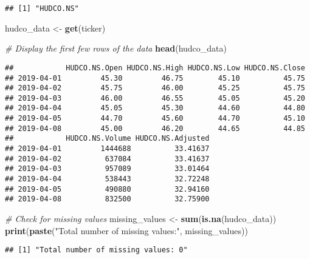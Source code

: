 \documentclass[
]{article}
\newenvironment{Shaded}{\begin{snugshade}}{\end{snugshade}}
\newcommand{\AttributeTok}[1]{\textcolor[rgb]{0.13,0.29,0.53}{#1}}
\newcommand{\CommentTok}[1]{\textcolor[rgb]{0.56,0.35,0.01}{\textit{#1}}}
\newcommand{\DecValTok}[1]{\textcolor[rgb]{0.00,0.00,0.81}{#1}}
\newcommand{\FunctionTok}[1]{\textcolor[rgb]{0.13,0.29,0.53}{\textbf{#1}}}
\newcommand{\NormalTok}[1]{#1}
\newcommand{\OtherTok}[1]{\textcolor[rgb]{0.56,0.35,0.01}{#1}}
\newcommand{\SpecialCharTok}[1]{\textcolor[rgb]{0.81,0.36,0.00}{\textbf{#1}}}
\newcommand{\StringTok}[1]{\textcolor[rgb]{0.31,0.60,0.02}{#1}}
\begin{document}
\begin{verbatim}
## [1] "HUDCO.NS"
\end{verbatim}

\begin{Shaded}
\begin{Highlighting}[]
\NormalTok{hudco\_data }\OtherTok{\textless{}{-}} \FunctionTok{get}\NormalTok{(ticker)}

\CommentTok{\# Display the first few rows of the data}
\FunctionTok{head}\NormalTok{(hudco\_data)}
\end{Highlighting}
\end{Shaded}

\begin{verbatim}
##            HUDCO.NS.Open HUDCO.NS.High HUDCO.NS.Low HUDCO.NS.Close
## 2019-04-01         45.30         46.75        45.10          45.75
## 2019-04-02         45.75         46.00        45.25          45.75
## 2019-04-03         46.00         46.55        45.05          45.20
## 2019-04-04         45.05         45.30        44.60          44.80
## 2019-04-05         44.70         45.60        44.70          45.10
## 2019-04-08         45.00         46.20        44.65          44.85
##            HUDCO.NS.Volume HUDCO.NS.Adjusted
## 2019-04-01         1444688          33.41637
## 2019-04-02          637084          33.41637
## 2019-04-03          957089          33.01464
## 2019-04-04          538443          32.72248
## 2019-04-05          490880          32.94160
## 2019-04-08          832500          32.75900
\end{verbatim}

\begin{Shaded}
\begin{Highlighting}[]
\CommentTok{\# Check for missing values}
\NormalTok{missing\_values }\OtherTok{\textless{}{-}} \FunctionTok{sum}\NormalTok{(}\FunctionTok{is.na}\NormalTok{(hudco\_data))}
\FunctionTok{print}\NormalTok{(}\FunctionTok{paste}\NormalTok{(}\StringTok{"Total number of missing values:"}\NormalTok{, missing\_values))}
\end{Highlighting}
\end{Shaded}

\begin{verbatim}
## [1] "Total number of missing values: 0"
\end{verbatim}

\begin{Shaded}
\end{Shaded}
\end{document}
